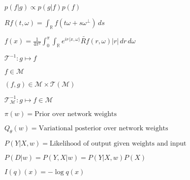 \documentclass[multi={mymath},border=1pt,convert={convertexe={convert},density=300,size=800x800,outext=.png}]{standalone}
\newenvironment{mymath}{$\displaystyle}{$}
\def\R{{\mathbb R}}
\def\T{ {\mathcal{T}} }
\def\M{ {\mathcal{M}} }
\def\<{{\langle}}
\def\>{{\rangle}}
\begin{document}
\begin{mymath}
p(f | g) \propto p(g | f) p(f)
\end{mymath}

\begin{mymath}
  Rf(t, \omega) = \int_{\R} f(t \omega + s \omega^{\perp}) \, ds
\end{mymath}

\begin{mymath}
  f(x) = \frac{1}{4 \pi^2} \int_0^{\pi} \int_{\R} e^{ir\<x, \omega\>} \widetilde{Rf}(r, \omega) |r| \,dr \,d\omega
\end{mymath}

\begin{mymath}
\T^{-1} : g \mapsto f
\end{mymath}

\begin{mymath}
f \in \M
\end{mymath}

\begin{mymath}
(f, g) \in \M \times \T(\M)
\end{mymath}

\begin{mymath}
\T_{\M}^{-1} : g \mapsto f \in \M
\end{mymath}


\begin{mymath}
\pi (w) = \textrm{Prior over network weights}
\end{mymath}

\begin{mymath}
Q_{\theta} (w) = \textrm{Variational posterior over network weights}
\end{mymath}

\begin{mymath}
P(Y | X, w) = \textrm{Likelihood of output given weights and input}
\end{mymath}

\begin{mymath}
P(D | w) = P(Y, X | w) = P(Y | X, w) P(X)
\end{mymath}

\begin{mymath}
I(q)(x) = - \log q(x)
\end{mymath}
\end{document}
